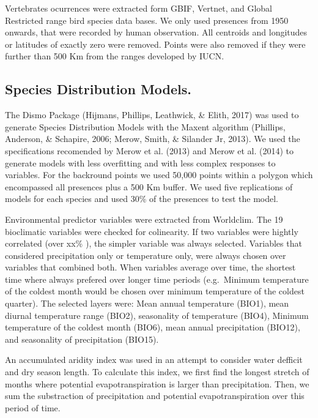 \documentclass[]{article}
\begin{document}
Vertebrates ocurrences were extracted form GBIF, Vertnet, and Global Restricted range bird species data bases. We only used presences from 1950 onwards, that were recorded by human observation. All centroids and longitudes or latitudes of exactly zero were removed. Points were also removed if they were further than 500 Km from the ranges developed by IUCN.

\hypertarget{species-distribution-models.}{%
\subsection{Species Distribution Models.}\label{species-distribution-models.}}

The Dismo Package (Hijmans, Phillips, Leathwick, \& Elith, 2017) was used to generate Species Distribution Models with the Maxent algorithm (Phillips, Anderson, \& Schapire, 2006; Merow, Smith, \& Silander Jr, 2013). We used the specifications recomended by Merow et al. (2013) and Merow et al. (2014) to generate models with less overfitting and with less complex responses to variables.
For the backround points we used 50,000 points within a polygon which encompassed all presences plus a 500 Km buffer. We used five replications of models for each species and used 30\% of the presences to test the model.

Environmental predictor variables were extracted from Worldclim. The 19 bioclimatic variables were checked for colinearity. If two variables were hightly correlated (over xx\% ), the simpler variable was always selected. Variables that considered precipitation only or temperature only, were always chosen over variables that combined both. When variables average over time, the shortest time where always prefered over longer time periods (e.g.~Minimum temperature of the coldest month would be chosen over minimum temperature of the coldest quarter). The selected layers were: Mean annual temperature (BIO1), mean diurnal temperature range (BIO2), seasonality of temperature (BIO4), Minimum temperature of the coldest month (BIO6), mean annual precipitation (BIO12), and seasonality of precipitation (BIO15).

An accumulated aridity index was used in an attempt to consider water defficit and dry season length. To calculate this index, we first find the longest stretch of months where potential evapotranspiration is larger than precipitation. Then, we sum the substraction of precipitation and potential evapotranspiration over this period of time.
\end{document}
